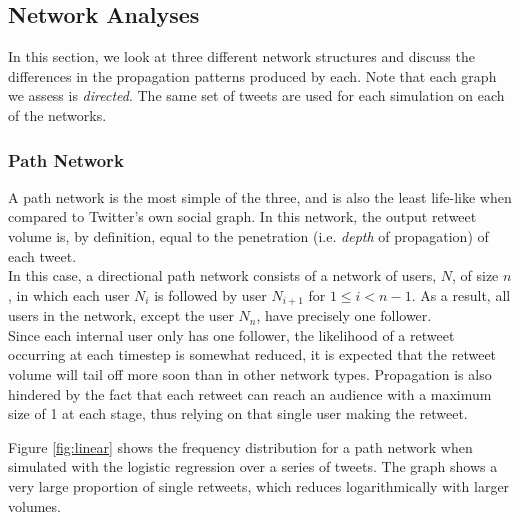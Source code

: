 \subsection{Network Analyses}
In this section, we look at three different network structures and discuss the differences in the propagation patterns produced by each. Note that each graph we assess is \textit{directed}. The same set of tweets are used for each simulation on each of the networks.

\subsubsection{Path Network}
A path network is the most simple of the three, and is also the least life-like when compared to Twitter's own social graph. In this network, the output retweet volume is, by definition, equal to the penetration (i.e. \emph{depth} of propagation) of each tweet.
\\
In this case, a directional path network consists of a network of users, $ N $, of size $ n $, in which each user $ N_i $ is followed by user $ N_{i+1} $ for $ 1 \le i < n-1 $. As a result, all users in the network, except the user $ N_n $, have precisely one follower.
\\
Since each internal user only has one follower, the likelihood of a retweet occurring at each timestep is somewhat reduced, it is expected that the retweet volume will tail off more soon than in other network types. Propagation is also hindered by the fact that each retweet can reach an audience with a maximum size of 1 at each stage, thus relying on that single user making the retweet.
\begin{figure}[h]
\end{figure}
Figure \ref{fig:linear} shows the frequency distribution for a path network when simulated with the logistic regression over a series of tweets. The graph shows a very large proportion of single retweets, which reduces logarithmically with larger volumes.

